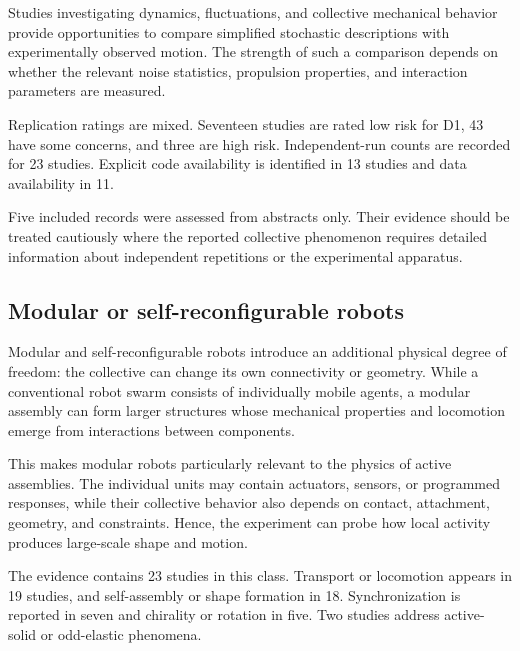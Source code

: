 Studies investigating dynamics,
fluctuations, and collective
mechanical behavior
\cite{Dmitriev2021statisticalcorrelat,Noirhomme2024brainbotsassmarta,Li2021programmingactivec,Siebers2023exploitingcompositi,Son2024emergentfunctional,Boudet2025nonmarkoviandynami,Mammadli2026physicsinformeddig,Titov2025differentialequatio,Bashkova2026differentialequatio,Lvay2026collectivedynamics}
provide opportunities to compare
simplified stochastic descriptions
with experimentally observed motion.
The strength of such a comparison
depends on whether the relevant
noise statistics, propulsion
properties, and interaction
parameters are measured.

Replication ratings are mixed.
Seventeen studies are rated
low risk for D1, 43 have
some concerns, and three
are high risk. Independent-run
counts are recorded for
23 studies. Explicit code
availability is identified
in 13 studies and data
availability in 11.

Five included records were
assessed from abstracts only.
Their evidence should be
treated cautiously where
the reported collective
phenomenon requires detailed
information about independent
repetitions or the
experimental apparatus.

\subsection{Modular or self-reconfigurable robots}
\label{sec:platforms-modular}

Modular and self-reconfigurable robots introduce
an additional physical degree of freedom:
the collective can change its own connectivity
or geometry. While a conventional robot swarm
consists of individually mobile agents,
a modular assembly can form larger structures
whose mechanical properties and locomotion
emerge from interactions between components.

This makes modular robots particularly relevant
to the physics of active assemblies.
The individual units may contain actuators,
sensors, or programmed responses, while
their collective behavior also depends
on contact, attachment, geometry, and
constraints. Hence, the experiment can
probe how local activity produces
large-scale shape and motion.

The evidence contains 23 studies in this
class. Transport or locomotion appears
in 19 studies, and self-assembly or
shape formation in 18. Synchronization
is reported in seven and chirality
or rotation in five. Two studies
address active-solid or
odd-elastic phenomena.

